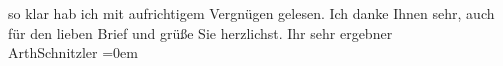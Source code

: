 \begin{ledgroupsized}[t]{13cm}
                    so klar hab ich mit aufrichtigem Vergnügen gelesen. Ich danke Ihnen sehr, auch
                    für den lieben Brief und grüße Sie herzlichst.\pend
           \pstart
           {\pb}Ihr sehr ergebner{\\[\baselineskip]}\spacefill\mbox{ArthSchnitzler}\pend
           \leftskip=0em{}\endnumbering{}\end{ledgroupsized}  \newcommand{\dateiname}{L02520}\newcommand{\titel}{Arthur Schnitzler an Robert Adam, 14. 8. 1929}\newcommand{\editorInnen}{Martin Anton Müller und Gerd-Hermann Susen}
      